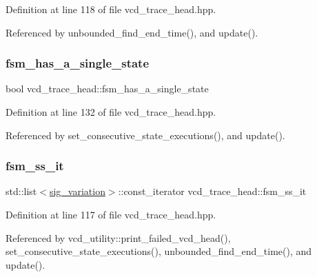 Definition at line 118 of file vcd\+\_\+trace\+\_\+head.\+hpp.



Referenced by unbounded\+\_\+find\+\_\+end\+\_\+time(), and update().

\mbox{\label{structvcd__trace__head_acc03a8b5a503e805abc218101be1a320}} 
\subsubsection{\texorpdfstring{fsm\+\_\+has\+\_\+a\+\_\+single\+\_\+state}{fsm\_has\_a\_single\_state}}
{\footnotesize\ttfamily bool vcd\+\_\+trace\+\_\+head\+::fsm\+\_\+has\+\_\+a\+\_\+single\+\_\+state}



Definition at line 132 of file vcd\+\_\+trace\+\_\+head.\+hpp.



Referenced by set\+\_\+consecutive\+\_\+state\+\_\+executions(), and update().

\mbox{\label{structvcd__trace__head_aa00e910431b3a8a5fca7bf6961739091}} 
\subsubsection{\texorpdfstring{fsm\+\_\+ss\+\_\+it}{fsm\_ss\_it}}
{\footnotesize\ttfamily std\+::list$<$\hyperlink{structsig__variation}{sig\+\_\+variation}$>$\+::const\+\_\+iterator vcd\+\_\+trace\+\_\+head\+::fsm\+\_\+ss\+\_\+it}



Definition at line 117 of file vcd\+\_\+trace\+\_\+head.\+hpp.



Referenced by vcd\+\_\+utility\+::print\+\_\+failed\+\_\+vcd\+\_\+head(), set\+\_\+consecutive\+\_\+state\+\_\+executions(), unbounded\+\_\+find\+\_\+end\+\_\+time(), and update().

